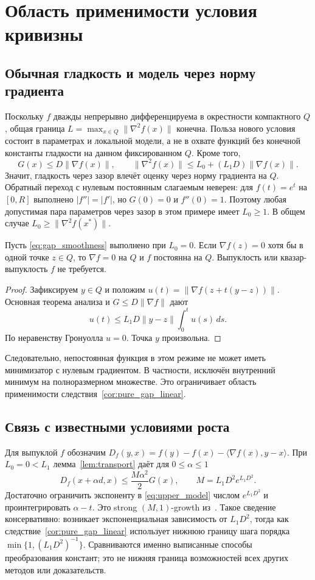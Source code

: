 \section{Область применимости условия кривизны}\label{sec:structure}
\subsection{Обычная гладкость и модель через норму градиента}
Поскольку $f$ дважды непрерывно дифференцируема в окрестности
компактного $Q$, общая граница $L=\max_{x\in Q}\|\nabla^2f(x)\|$
конечна. Польза нового условия состоит в параметрах и локальной
модели, а не в охвате функций без конечной константы гладкости на
данном фиксированном $Q$. Кроме того,
\[
 G(x)\le D\|\nabla f(x)\|,
 \qquad \|\nabla^2f(x)\|\le L_0+(L_1D)\|\nabla f(x)\|.
\]
Значит, гладкость через зазор влечёт оценку через норму градиента на $Q$.
Обратный переход с нулевым постоянным слагаемым неверен:
для $f(t)=e^t$ на $[0,R]$ выполнено $|f''|=|f'|$, но $G(0)=0$
и $f''(0)=1$. Поэтому любая допустимая пара параметров через зазор
в этом примере имеет $L_0\ge1$. В общем случае
$L_0\ge\|\nabla^2f(x^*)\|$.

\begin{proposition}
\label{prop:rigidity}
Пусть \eqref{eq:gap_smoothness} выполнено при $L_0=0$.
Если $\nabla f(z)=0$ хотя бы в одной точке $z\in Q$, то
$\nabla f=0$ на $Q$ и $f$ постоянна на $Q$.
Выпуклость или квазар-выпуклость $f$ не требуется.
\end{proposition}
\begin{proof}
Зафиксируем $y\in Q$ и положим $u(t)=\|\nabla f(z+t(y-z))\|$.
Основная теорема анализа и $G\le D\|\nabla f\|$ дают
\[
 u(t)\le L_1D\|y-z\|\int_0^t u(s)\,ds.
\]
По неравенству Гронуолла $u=0$. Точка $y$ произвольна.
\end{proof}
Следовательно, непостоянная функция в этом режиме не может иметь
минимизатор с нулевым градиентом. В частности, исключён внутренний
минимум на полноразмерном множестве. Это ограничивает область
применимости следствия~\ref{cor:pure_gap_linear}.

\subsection{Связь с известными условиями роста}
Для выпуклой $f$ обозначим
$D_f(y,x)=f(y)-f(x)-\langle\nabla f(x),y-x\rangle$.
При $L_0=0<L_1$ лемма~\ref{lem:transport} даёт для $0\le\alpha\le1$
\[
 D_f(x+\alpha d,x)\le\frac{M\alpha^2}{2}G(x),
 \qquad M=L_1D^2e^{L_1D^2}.
\]
Достаточно ограничить экспоненту в \eqref{eq:upper_model} числом
$e^{L_1D^2}$ и проинтегрировать $\alpha-t$.
Это strong $(M,1)$-growth из~\cite{wirth}.
Такое сведение консервативно: возникает экспоненциальная зависимость
от $L_1D^2$, тогда как следствие~\ref{cor:pure_gap_linear} использует
нижнюю границу шага порядка $\min\{1,(L_1D^2)^{-1}\}$.
Сравниваются именно выписанные способы преобразования констант;
это не нижняя граница возможностей всех других методов или доказательств.

